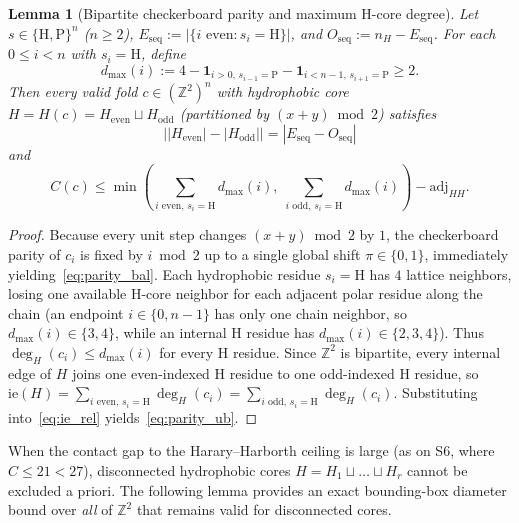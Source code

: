 \documentclass[11pt]{article}
\newtheorem{lemma}{Lemma}
\newcommand{\Z}{\mathbb{Z}}
\begin{document}
\begin{lemma}[Bipartite checkerboard parity and maximum H-core degree]\label{lem:parity}
Let $s \in \{\mathrm{H}, \mathrm{P}\}^n$ ($n \ge 2$), $E_{\mathrm{seq}} := |\{i \text{ even} : s_i = \mathrm{H}\}|$, and $O_{\mathrm{seq}} := n_H - E_{\mathrm{seq}}$. For each $0 \le i < n$ with $s_i = \mathrm{H}$, define
\[
  d_{\max}(i) := 4 - \mathbf{1}_{i > 0,\, s_{i-1} = \mathrm{P}} - \mathbf{1}_{i < n - 1,\, s_{i+1} = \mathrm{P}} \ge 2.
\]
Then every valid fold $c \in (\Z^2)^n$ with hydrophobic core $H = H(c) = H_{\mathrm{even}} \sqcup H_{\mathrm{odd}}$ (partitioned by $(x + y) \bmod 2$) satisfies
\begin{equation}\label{eq:parity_bal}
  \bigl| |H_{\mathrm{even}}| - |H_{\mathrm{odd}}| \bigr| = |E_{\mathrm{seq}} - O_{\mathrm{seq}}|
\end{equation}
and
\begin{equation}\label{eq:parity_ub}
  C(c) \le \min\!\left(\sum_{i \text{ even},\, s_i=\mathrm{H}} d_{\max}(i),\; \sum_{i \text{ odd},\, s_i=\mathrm{H}} d_{\max}(i)\right) - \mathrm{adj}_{HH}.
\end{equation}
\end{lemma}

\begin{proof}
Because every unit step changes $(x + y) \bmod 2$ by $1$, the checkerboard parity of $c_i$ is fixed by $i \bmod 2$ up to a single global shift $\pi \in \{0, 1\}$, immediately yielding~\eqref{eq:parity_bal}. Each hydrophobic residue $s_i = \mathrm{H}$ has $4$ lattice neighbors, losing one available H-core neighbor for each adjacent polar residue along the chain (an endpoint $i \in \{0, n - 1\}$ has only one chain neighbor, so $d_{\max}(i) \in \{3, 4\}$, while an internal H residue has $d_{\max}(i) \in \{2, 3, 4\}$). Thus $\deg_H(c_i) \le d_{\max}(i)$ for every H residue. Since $\Z^2$ is bipartite, every internal edge of $H$ joins one even-indexed H residue to one odd-indexed H residue, so $\mathrm{ie}(H) = \sum_{i \text{ even},\, s_i=\mathrm{H}} \deg_H(c_i) = \sum_{i \text{ odd},\, s_i=\mathrm{H}} \deg_H(c_i)$. Substituting into~\eqref{eq:ie_rel} yields~\eqref{eq:parity_ub}.
\end{proof}

When the contact gap to the Harary--Harborth ceiling is large (as on S6, where $C \le 21 < 27$), disconnected hydrophobic cores $H = H_1 \sqcup \dots \sqcup H_r$ cannot be excluded a priori. The following lemma provides an exact bounding-box diameter bound over \emph{all} of $\Z^2$ that remains valid for disconnected cores.
\end{document}
